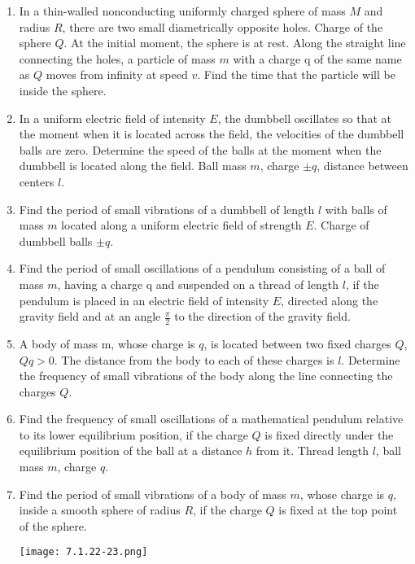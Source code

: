 \documentclass{article}
\begin{document}
\begin{enumerate}[label=7.1.\arabic*]
\item In a thin-walled nonconducting uniformly charged sphere of mass $M$ and radius $R$, there are two small diametrically opposite holes. Charge of the sphere $Q$. At the initial moment, the sphere is at rest. Along the straight line connecting the holes, a particle of mass $m$ with a charge q of the same name as $Q$ moves from infinity at speed $v$. Find the time that the particle will be inside the sphere.

\item In a uniform electric field of intensity $E$, the dumbbell oscillates so that at the moment when it is located across the field, the velocities of the dumbbell balls are zero. Determine the speed of the balls at the moment when the dumbbell is located along the field. Ball mass $m$, charge $\pm q$, distance between centers $l$.

\item Find the period of small vibrations of a dumbbell of length $l$ with balls of mass $m$ located along a uniform electric field of strength $E$. Charge of dumbbell balls $\pm q$.

\item Find the period of small oscillations of a pendulum consisting of a ball of mass $m$, having a charge q and suspended on a thread of length $l$, if the pendulum is placed in an electric field of intensity $E$, directed along the gravity field and at an angle $\frac{\pi}{2}$ to the direction of the gravity field.

\item A body of mass m, whose charge is $q$, is located between two fixed charges $Q$, $Qq > 0$. The distance from the body to each of these charges is $l$. Determine the frequency of small vibrations of the body along the line connecting the charges $Q$.

\item Find the frequency of small oscillations of a mathematical pendulum relative to its lower equilibrium position, if the charge $Q$ is fixed directly under the equilibrium position of the ball at a distance $h$ from it. Thread length $l$, ball mass $m$, charge $q$.

\item Find the period of small vibrations of a body of mass $m$, whose charge is $q$, inside a smooth sphere of radius $R$, if the charge $Q$ is fixed at the top point of the sphere.

\begin{center}
    \texttt{[image: 7.1.22-23.png]}
\end{center}


\end{enumerate}
\end{document}
